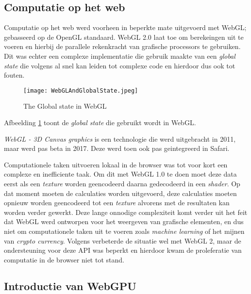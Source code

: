 \subsection*{Computatie op het web}

Computatie op het web werd voorheen in beperkte mate uitgevoerd met WebGL; gebasseerd op de OpenGL standaard. WebGL 2.0 laat toe om berekeingen uit te voeren en hierbij de parallele rekenkracht van grafische processors te gebruiken. Dit was echter een complexe implementatie die gebruik maakte van een \textit{global state} die volgens \textcite{Surma2022} al snel kan leiden tot complexe code en hierdoor dus ook tot fouten.

\begin{figure}
    \texttt{[image: WebGLAndGlobalState.jpeg]}
    \caption{The Global state in WebGL}
    \label{fig:WebGL Global State}
\end{figure}

Afbeelding \ref{fig:WebGL Global State} toont de \textit{global state} die gebruikt wordt in WebGL.

\bigbreak{}

\textit{WebGL - 3D Canvas graphics} is een technologie die werd uitgebracht in 2011, maar werd pas beta in 2017. Deze werd toen ook pas geintegreerd in Safari.

\bigbreak{}

Computationele taken uitvoeren lokaal in de browser was tot voor kort een complexe en inefficiente taak. Om dit met WebGL 1.0 te doen moet deze data eerst als een \textit{texture} worden geencodeerd daarna gedecodeerd in een \textit{shader}. Op dat moment moeten de calculaties worden uitgevoerd, deze calculaties moeten opnieuw worden geencodeerd tot een \textit{texture} alvorens met de resultaten kan worden verder gewerkt. \autocite{Surma2022} Deze lange onnodige complexiteit komt verder uit het feit dat WebGL werd ontworpen voor het weergeven van grafische elementen, en dus niet om computationele taken uit te voeren zoals \textit{machine learning} of het mijnen van \textit{crypto currency}. Volgens \textcite{Surma2022} verbeterde de situatie wel met WebGL 2, maar de ondersteuning voor deze API was beperkt en hierdoor kwam de proleferatie van computatie in de browser niet tot stand.

\subsection{Introductie van WebGPU}

